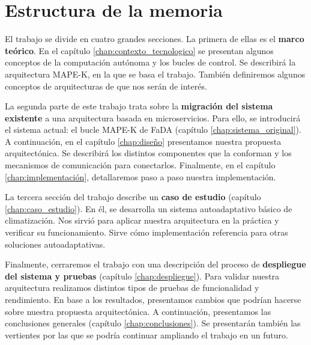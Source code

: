 \section{Estructura de la memoria}

El trabajo se divide en cuatro grandes secciones. La primera de ellas es el \textbf{marco teórico}. En el capítulo \ref{chap:contexto_tecnologico} se presentan algunos conceptos de la computación autónoma y los bucles de control. Se describirá la arquitectura MAPE-K, en la que se basa el trabajo. También definiremos algunos conceptos de arquitecturas de  que nos serán de interés.

La segunda parte de este trabajo trata sobre la \textbf{migración del sistema existente} a una arquitectura basada en microservicios. Para ello, se introducirá el sistema actual: el bucle MAPE-K  de FaDA (capítulo \ref{chap:sistema_original}). A continuación, en el capítulo \ref{chap:diseño} presentamos nuestra propuesta arquitectónica. Se describirá los distintos componentes que la conforman y los mecanismos de comunicación para conectarlos. Finalmente, en el capítulo \ref{chap:implementación}, detallaremos paso a paso nuestra implementación.

La tercera sección del trabajo describe un \textbf{caso de estudio} (capítulo \ref{chap:caso_estudio}). En él, se desarrolla un sistema autoadaptativo básico de climatización. Nos sirvió para aplicar nuestra arquitectura en la práctica y verificar su funcionamiento. Sirve cómo implementación referencia para otras soluciones autoadaptativas.

Finalmente, cerraremos el trabajo con una descripción del proceso de \textbf{despliegue del sistema y pruebas} (capítulo \ref{chap:despliegue}). Para validar nuestra arquitectura realizamos distintos tipos de pruebas de funcionalidad y rendimiento. En base a los resultados, presentamos cambios que podrían hacerse sobre nuestra propuesta arquitectónica. A continuación, presentamos las conclusiones  generales (capítulo \ref{chap:conclusiones}). Se presentarán también las vertientes por las que se podría continuar ampliando el trabajo en un futuro.
